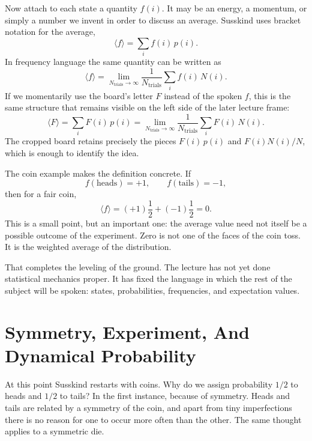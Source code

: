 Now attach to each state a quantity \(f(i)\). It may be an energy, a momentum, or simply a number we invent in order to discuss an average. Susskind uses bracket notation for the average,
\begin{equation}
\langle f\rangle=\sum_i f(i)\,p(i).
\end{equation}
In frequency language the same quantity can be written as
\begin{equation}
\langle f\rangle
=
\lim_{N_{\text{trials}}\to\infty}
\frac{1}{N_{\text{trials}}}
\sum_i f(i)\,N(i).
\end{equation}
If we momentarily use the board's letter \(F\) instead of the spoken \(f\), this is the same structure that remains visible on the left side of the later lecture frame:
\begin{equation}
\langle F\rangle
=
\sum_i F(i)\,p(i)
=
\lim_{N_{\text{trials}}\to\infty}
\frac{1}{N_{\text{trials}}}
\sum_i F(i)\,N(i).
\end{equation}
The cropped board retains precisely the pieces \(F(i)\,p(i)\) and \(F(i)N(i)/N\), which is enough to identify the idea.

The coin example makes the definition concrete. If
\begin{equation}
f(\text{heads})=+1,
\qquad
f(\text{tails})=-1,
\end{equation}
then for a fair coin,
\begin{equation}
\langle f\rangle=(+1)\frac12+(-1)\frac12=0.
\end{equation}
This is a small point, but an important one: the average value need not itself be a possible outcome of the experiment. Zero is not one of the faces of the coin toss. It is the weighted average of the distribution.

That completes the leveling of the ground. The lecture has not yet done statistical mechanics proper. It has fixed the language in which the rest of the subject will be spoken: states, probabilities, frequencies, and expectation values.

\section{Symmetry, Experiment, And Dynamical Probability}

At this point Susskind restarts with coins. Why do we assign probability \(1/2\) to heads and \(1/2\) to tails? In the first instance, because of symmetry. Heads and tails are related by a symmetry of the coin, and apart from tiny imperfections there is no reason for one to occur more often than the other. The same thought applies to a symmetric die.

